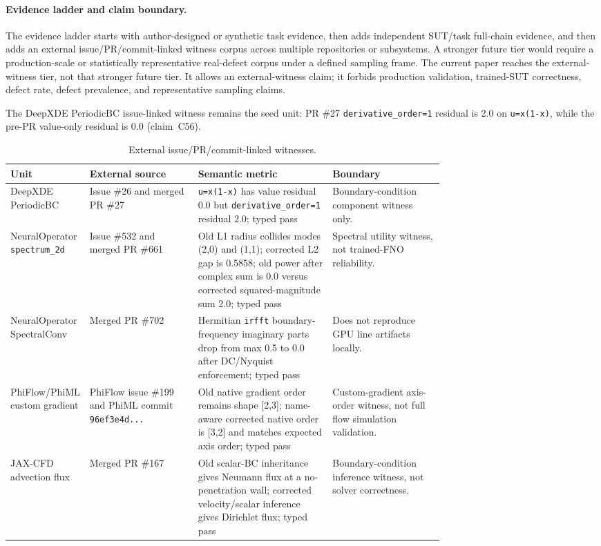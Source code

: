 \paragraph{Evidence ladder and claim boundary.}
The evidence ladder starts with author-designed or synthetic task evidence,
then adds independent SUT/task full-chain evidence, and then adds an external
issue/PR/commit-linked witness corpus across multiple repositories or
subsystems. A stronger future tier would require a production-scale or
statistically representative real-defect corpus under a defined sampling frame.
The current paper reaches the external-witness tier, not that stronger future
tier. It allows an external-witness claim; it forbids production validation,
trained-SUT correctness, defect rate, defect prevalence, and representative
sampling claims.

The DeepXDE PeriodicBC issue-linked witness remains the seed unit: PR \#27
\texttt{derivative\_order=1} residual is 2.0 on \texttt{u=x(1-x)}, while the
pre-PR value-only residual is 0.0 (claim~C56).

{\scriptsize
\renewcommand{\arraystretch}{0.92}
\begin{xltabular}{\linewidth}{@{}>{\raggedright\arraybackslash}p{0.17\linewidth}>{\raggedright\arraybackslash}p{0.25\linewidth}>{\raggedright\arraybackslash}p{0.31\linewidth}Y@{}}
\caption{External issue/PR/commit-linked witnesses.}\label{tab:external-defect-corpus}\\
\toprule
\textbf{Unit} & \textbf{External source} & \textbf{Semantic metric} & \textbf{Boundary} \\
\midrule
DeepXDE PeriodicBC & Issue \#26 and merged PR \#27 & \texttt{u=x(1-x)} has value residual 0.0 but \texttt{derivative\_order=1} residual 2.0; typed pass & Boundary-condition component witness only. \\
NeuralOperator \texttt{spectrum\_2d} & Issue \#532 and merged PR \#661 & Old L1 radius collides modes (2,0) and (1,1); corrected L2 gap is 0.5858; old power after complex sum is 0.0 versus corrected squared-magnitude sum 2.0; typed pass & Spectral utility witness, not trained-FNO reliability. \\
NeuralOperator SpectralConv & Merged PR \#702 & Hermitian \texttt{irfft} boundary-frequency imaginary parts drop from max 0.5 to 0.0 after DC/Nyquist enforcement; typed pass & Does not reproduce GPU line artifacts locally. \\
PhiFlow/PhiML custom gradient & PhiFlow issue \#199 and PhiML commit \texttt{96ef3e4d...} & Old native gradient order remains shape [2,3]; name-aware corrected native order is [3,2] and matches expected axis order; typed pass & Custom-gradient axis-order witness, not full flow simulation validation. \\
JAX-CFD advection flux & Merged PR \#167 & Old scalar-BC inheritance gives Neumann flux at a no-penetration wall; corrected velocity/scalar inference gives Dirichlet flux; typed pass & Boundary-condition inference witness, not solver correctness. \\
\bottomrule
\end{xltabular}
}
